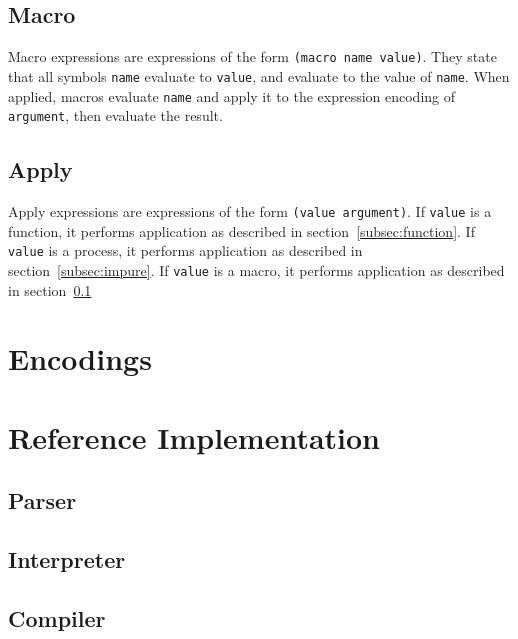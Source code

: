 \documentclass{article}
\begin{document}
\begin{multicols}{2}
        \subsection{Macro}\label{subsec:macro}

        Macro expressions are expressions of the form \lstinline$(macro name value)$.
        They state that all symbols \lstinline$name$ evaluate to \lstinline$value$, and evaluate to the value of \lstinline$name$.
        When applied, macros evaluate \lstinline$name$ and apply it to the expression encoding of \lstinline$argument$, then evaluate the result.
        \newline

        \subsection{Apply}\label{subsec:apply}

        Apply expressions are expressions of the form \lstinline$(value argument)$.
        If \lstinline$value$ is a function, it performs application as described in section~\ref{subsec:function}.
        If \lstinline$value$ is a process, it performs application as described in section~\ref{subsec:impure}.
        If \lstinline$value$ is a macro, it performs application as described in section~\ref{subsec:macro}
        \newline
    \end{multicols}
    \newpage

    \section{Encodings}\label{sec:encodings}

    \begin{multicols*}{2}
        
    \end{multicols*}
    \newpage

    \section{Reference Implementation}\label{sec:implementation}

    \subsection{Parser}\label{subsec:parser}

    

    \subsection{Interpreter}\label{subsec:interpreter}

    

    \subsection{Compiler}\label{subsec:compiler}

    
\end{document}
